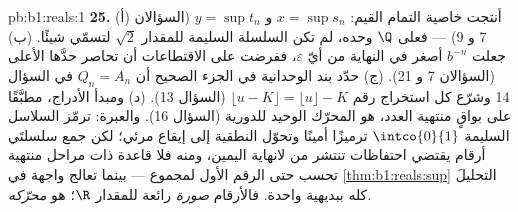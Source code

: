 \begin{solution}{pb:b1:reals:1}
\textbf{25.} (أ) أنتجت خاصية التمام القيم: $x = \sup s_n$
و $y = \sup t_n$ (السؤالان 7 و 9) --- فعلى $\Q$ وحده، لم تكن
السلسلة السليمة للمقدار $\sqrt 2$ لتسمّي شيئًا. (ب) جعلت
 $b^{-n}$ أصغر في النهاية من أيّ
$\varepsilon$، ففرضت على الاقتطاعات أن تحاصر حدَّها
الأعلى (السؤالان 7 و 21). (ج) حدّد بند الوحدانية في
الجزء الصحيح أن $Q_n = A_n$ في السؤال 14 وشرّع كل
استخراج رقم $\lfloor u - K \rfloor = \lfloor u \rfloor - K$
(السؤال 13). (د) ومبدأ الأدراج، مطبَّقًا على بواقٍ منتهية
العدد، هو المحرّك الوحيد للدورية (السؤال 16).
والعبرة: ترمّز السلاسل السليمة $\intco{0}{1}$ ترميزًا أمينًا وتحوّل
النطقية إلى إيقاع مرئي؛ لكن جمع سلسلتَي أرقام
يقتضي احتفاظات تنتشر من لانهاية اليمين، ومنه فلا
قاعدة ذات مراحل منتهية تحسب حتى الرقم الأول لمجموع ---
بينما تعالج واجهة  في \cref{thm:b1:reals:sup}
التحليلَ كله ببديهية واحدة. فالأرقام \emph{صورة} رائعة
للمقدار $\R$؛  هو \emph{محرّكه}.
\end{solution}
